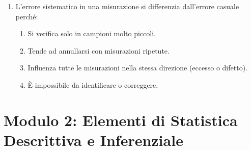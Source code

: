 \documentclass[12pt, a4paper]{article}
\begin{document}
\begin{enumerate}[resume]
    \item L'errore sistematico in una misurazione si differenzia dall'errore casuale perché:
    \begin{enumerate}
        \item Si verifica solo in campioni molto piccoli.
        \item Tende ad annullarsi con misurazioni ripetute.
        \item Influenza tutte le misurazioni nella stessa direzione (eccesso o difetto).
        \item È impossibile da identificare o correggere.
    \end{enumerate}
    \vspace{0.3cm}
\end{enumerate}

\section*{Modulo 2: Elementi di Statistica Descrittiva e Inferenziale}
\end{document}
